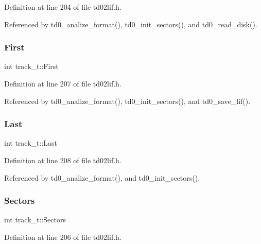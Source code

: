Definition at line 204 of file td02lif.\+h.



Referenced by td0\+\_\+analize\+\_\+format(), td0\+\_\+init\+\_\+sectors(), and td0\+\_\+read\+\_\+disk().

\mbox{\label{structtrack__t_a1ffa3863c3fb622cb158e5275c99c55c}} 
\subsubsection{\texorpdfstring{First}{First}}
{\footnotesize\ttfamily int track\+\_\+t\+::\+First}



Definition at line 207 of file td02lif.\+h.



Referenced by td0\+\_\+analize\+\_\+format(), td0\+\_\+init\+\_\+sectors(), and td0\+\_\+save\+\_\+lif().

\mbox{\label{structtrack__t_a9ebaf56b7b9c814e5e9c39dea130fa18}} 
\subsubsection{\texorpdfstring{Last}{Last}}
{\footnotesize\ttfamily int track\+\_\+t\+::\+Last}



Definition at line 208 of file td02lif.\+h.



Referenced by td0\+\_\+analize\+\_\+format(), and td0\+\_\+init\+\_\+sectors().

\mbox{\label{structtrack__t_a9a073d98f27d50ffda7991ea8099f269}} 
\subsubsection{\texorpdfstring{Sectors}{Sectors}}
{\footnotesize\ttfamily int track\+\_\+t\+::\+Sectors}



Definition at line 206 of file td02lif.\+h.



